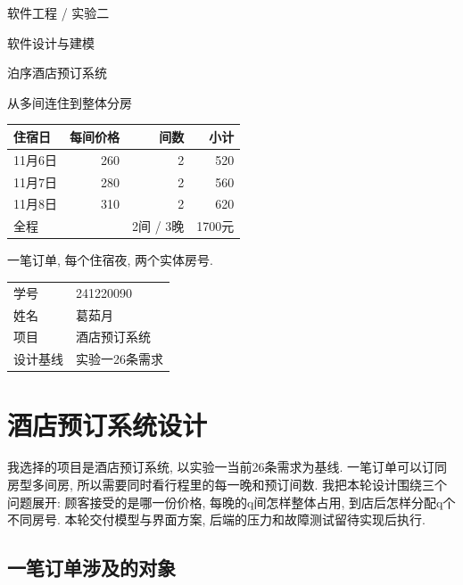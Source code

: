 \documentclass[cn,nofont,11pt,a4paper]{elegantpaper}
\begin{document}
\begin{titlepage}
\thispagestyle{empty}
{\sffamily\color{wood}\large 软件工程 / 实验二\par}
\vspace{28mm}
{\sffamily\fontsize{32}{43}\selectfont 软件设计与建模\par}
\vspace{8mm}
{\sffamily\fontsize{24}{32}\selectfont 泊序酒店预订系统\par}
\vspace{14mm}
\noindent{\color{paperline}\rule{\linewidth}{1pt}}\par
\vspace{8mm}
{\large 从多间连住到整体分房\par}
\vspace{10mm}
\begin{tabular}{@{}lrrr@{}}
住宿日 & 每间价格 & 间数 & 小计\\\midrule
11月6日 & 260 & 2 & 520\\
11月7日 & 280 & 2 & 560\\
11月8日 & 310 & 2 & 620\\\midrule
全程 & & 2间 / 3晚 & 1700元
\end{tabular}\par
\vspace{10mm}
\small 一笔订单, 每个住宿夜, 两个实体房号.\par
\vfill
\begin{tabular}{@{}ll}
学号 & 241220090\\
姓名 & 葛茹月\\
项目 & 酒店预订系统\\
设计基线 & 实验一26条需求
\end{tabular}
\end{titlepage}
\tableofcontents
\clearpage{}
\hypertarget{ux9152ux5e97ux9884ux8ba2ux7cfbux7edfux8bbeux8ba1}{%
\section{酒店预订系统设计}\label{ux9152ux5e97ux9884ux8ba2ux7cfbux7edfux8bbeux8ba1}}

我选择的项目是酒店预订系统, 以实验一当前26条需求为基线. 一笔订单可以订同房型多间房, 所以需要同时看行程里的每一晚和预订间数. 我把本轮设计围绕三个问题展开: 顾客接受的是哪一份价格, 每晚的q间怎样整体占用, 到店后怎样分配q个不同房号. 本轮交付模型与界面方案, 后端的压力和故障测试留待实现后执行.

\hypertarget{ux4e00ux7b14ux8ba2ux5355ux6d89ux53caux7684ux5bf9ux8c61}{%
\subsection{一笔订单涉及的对象}\label{ux4e00ux7b14ux8ba2ux5355ux6d89ux53caux7684ux5bf9ux8c61}}
\end{document}
